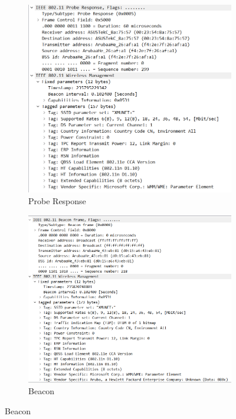 \documentclass[a4paper,twoside]{article}
\begin{document}
\begin{spacing}{1.2}
\begin{figure}[H]
	\centering
	\caption{管理帧}
	\label{fig:ctl}
	\begin{subfigure}{0.4\textwidth}
		\centering
		\includegraphics[width=\textwidth]{prob_res.png}
		\caption{Probe Response}
		\label{fig:prob_res}
	\end{subfigure}
	\begin{subfigure}{0.4\textwidth}
		\centering
		\includegraphics[width=\textwidth]{beacon.png}
		\caption{Beacon}
		\label{fig:beacon}
	\end{subfigure}
\end{figure}



\end{spacing}
\end{document}
